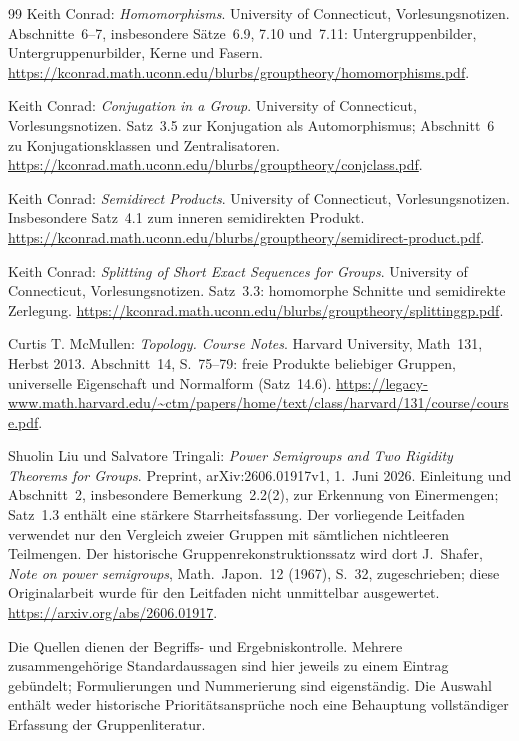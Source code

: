 \begin{thebibliography}{99}
Keith Conrad: \emph{Homomorphisms}.
University of Connecticut, Vorlesungsnotizen.
Abschnitte~6--7, insbesondere Sätze~6.9, 7.10 und~7.11:
Untergruppenbilder, Untergruppenurbilder, Kerne und Fasern.
\url{https://kconrad.math.uconn.edu/blurbs/grouptheory/homomorphisms.pdf}.

Keith Conrad: \emph{Conjugation in a Group}.
University of Connecticut, Vorlesungsnotizen.
Satz~3.5 zur Konjugation als Automorphismus; Abschnitt~6
zu Konjugationsklassen und Zentralisatoren.
\url{https://kconrad.math.uconn.edu/blurbs/grouptheory/conjclass.pdf}.

Keith Conrad: \emph{Semidirect Products}.
University of Connecticut, Vorlesungsnotizen.
Insbesondere Satz~4.1 zum inneren semidirekten Produkt.
\url{https://kconrad.math.uconn.edu/blurbs/grouptheory/semidirect-product.pdf}.

Keith Conrad: \emph{Splitting of Short Exact Sequences for Groups}.
University of Connecticut, Vorlesungsnotizen.
Satz~3.3: homomorphe Schnitte und semidirekte Zerlegung.
\url{https://kconrad.math.uconn.edu/blurbs/grouptheory/splittinggp.pdf}.

Curtis T. McMullen: \emph{Topology. Course Notes}.
Harvard University, Math~131, Herbst 2013.
Abschnitt~14, S.~75--79: freie Produkte beliebiger Gruppen,
universelle Eigenschaft und Normalform (Satz~14.6).
\url{https://legacy-www.math.harvard.edu/~ctm/papers/home/text/class/harvard/131/course/course.pdf}.

Shuolin Liu und Salvatore Tringali:
\emph{Power Semigroups and Two Rigidity Theorems for Groups}.
Preprint, arXiv:2606.01917v1, 1.~Juni 2026.
Einleitung und Abschnitt~2, insbesondere Bemerkung~2.2(2),
zur Erkennung von Einermengen; Satz~1.3 enthält eine stärkere
Starrheitsfassung. Der vorliegende Leitfaden verwendet nur den
Vergleich zweier Gruppen mit sämtlichen nichtleeren Teilmengen.
Der historische Gruppenrekonstruktionssatz wird dort J.~Shafer,
\emph{Note on power semigroups}, Math.\ Japon.\ 12 (1967), S.~32,
zugeschrieben; diese Originalarbeit wurde für den Leitfaden
nicht unmittelbar ausgewertet.
\url{https://arxiv.org/abs/2606.01917}.

\end{thebibliography}

\noindent
Die Quellen dienen der Begriffs- und Ergebniskontrolle. Mehrere
zusammengehörige Standardaussagen sind hier jeweils zu einem Eintrag
gebündelt; Formulierungen und Nummerierung sind eigenständig.
Die Auswahl enthält weder historische Prioritätsansprüche noch
eine Behauptung vollständiger Erfassung der Gruppenliteratur.

